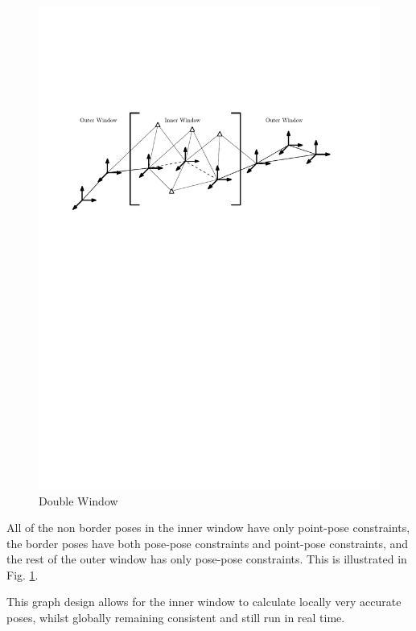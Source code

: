 \begin{figure}[h!]
  \centering
    \includegraphics[width=1.0\textwidth]{chapters/images/double_win}
  \caption{Double Window}
  \label{fig:double_window}
\end{figure}

All of the non border poses in the inner window have only point-pose constraints, the border poses have both pose-pose constraints and point-pose constraints, and the rest of the outer window has only pose-pose constraints.  This is illustrated in Fig. \ref{fig:double_window}.  

This graph design allows for the inner window to calculate locally very accurate poses, whilst globally remaining consistent and still run in real time.

